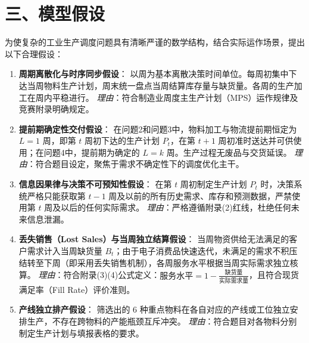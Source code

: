 \section{三、模型假设}\label{ux4e09ux6a21ux578bux5047ux8bbe}

为使复杂的工业生产调度问题具有清晰严谨的数学结构，结合实际运作场景，提出以下合理假设：

\begin{enumerate}
\def\labelenumi{\arabic{enumi}.}
\item
  \textbf{周期离散化与时序同步假设}：
  以周为基本离散决策时间单位。每周初集中下达当周物料生产计划，周末统一盘点当周结算库存量与缺货量。各周的生产加工在周内平稳进行。
  \emph{理由}：符合制造业周度主生产计划（MPS）运作规律及竞赛附录明确规定。
\item
  \textbf{提前期确定性交付假设}：
  在问题2和问题3中，物料加工与物流提前期恒定为 \(L=1\) 周，即第 \(t\)
  周初下达的生产计划 \(P_t\)，在第 \(t+1\)
  周初准时送达并可供使用；在问题4中，提前期为确定的 \(L=k\)
  周。生产过程无废品与交货延误。
  \emph{理由}：符合题目设定，聚焦于需求不确定性下的调度优化主干。
\item
  \textbf{信息因果律与决策不可预知性假设}： 在第 \(t\) 周初制定生产计划
  \(P_t\) 时，决策系统严格只能获取第 \(t-1\)
  周及以前的所有历史需求、库存和预测数据，严禁使用第 \(t\)
  周及以后的任何实际需求。
  \emph{理由}：严格遵循附录(2)红线，杜绝任何未来信息泄漏。
\item
  \textbf{丢失销售（Lost Sales）与当周独立结算假设}：
  当周物资供给无法满足的客户需求计入当周缺货量
  \(B_t\)；由于电子消费品快速迭代，未满足的需求不积压结转至下周（即采用丢失销售机制），各周服务水平根据当周实际需求独立核算。
  \emph{理由}：符合附录(3)(4)公式定义：\(\text{服务水平} = 1 - \frac{\text{缺货量}}{\text{实际需求量}}\)，且符合现货满足率（Fill
  Rate）评价准则。
\item
  \textbf{产线独立排产假设}： 筛选出的 6
  种重点物料在各自对应的产线或工位独立安排生产，不存在跨物料的产能瓶颈互斥冲突。
  \emph{理由}：符合题目对各物料分别制定生产计划与填报表格的要求。
\end{enumerate}
